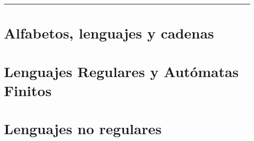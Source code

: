 \documentclass[12pt,a4paper]{book}
\begin{document}
\renewcommand{\contentsname}{\vspace{1cm} Contenido \vspace{-2cm} }


\begin{titlepage}
\vspace*{2cm}

\noindent
\vspace*{0.5cm}

\vspace{1.5cm}
\null\vfill
\vspace*{1cm}
\noindent
\hfill
\begin{minipage}{0.7\linewidth}
    \begin{flushright}
        \printauthor
    \end{flushright}
\end{minipage}
%
\begin{minipage}{0.02\linewidth}
    \rule{1pt}{140pt}
\end{minipage}
\titlepagedecoration
\end{titlepage}


\tableofcontents
\cleardoublepage


\chapter{Alfabetos, lenguajes y cadenas}

\chapter{Lenguajes Regulares y Autómatas Finitos}

\chapter{Lenguajes no regulares}

\end{document}
